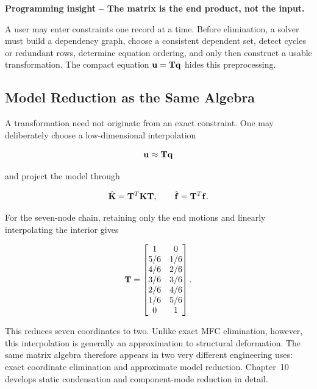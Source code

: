 \begin{bbox}
\textbf{Programming insight -- The matrix is the end product, not the input.}

A user may enter constraints one record at a time. Before elimination, a solver
must build a dependency graph, choose a consistent dependent set, detect cycles
or redundant rows, determine equation ordering, and only then construct a usable
transformation. The compact equation $\mathbf{u}=\mathbf{T}\mathbf{q}$ hides this preprocessing.
\end{bbox}

\subsection{Model Reduction as the Same Algebra}

A transformation need not originate from an exact constraint. One may deliberately
choose a low-dimensional interpolation

\begin{equation}
    \mathbf{u}\approx\mathbf{T}\mathbf{q}
\end{equation}

and project the model through

\begin{equation}
    \hat{\mathbf{K}}=\mathbf{T}^T\mathbf{K}\mathbf{T},
    \qquad
    \hat{\mathbf{f}}=\mathbf{T}^T\mathbf{f}.
\end{equation}

For the seven-node chain, retaining only the end motions and linearly
interpolating the interior gives

\begin{equation}
\mathbf{T}=\begin{bmatrix}
1&0\\
5/6&1/6\\
4/6&2/6\\
3/6&3/6\\
2/6&4/6\\
1/6&5/6\\
0&1
\end{bmatrix}.
\end{equation}

This reduces seven coordinates to two. Unlike exact MFC elimination, however,
this interpolation is generally an approximation to structural deformation.
The same matrix algebra therefore appears in two very different engineering
uses: exact coordinate elimination and approximate model reduction. Chapter~10
develops static condensation and component-mode reduction in detail.

